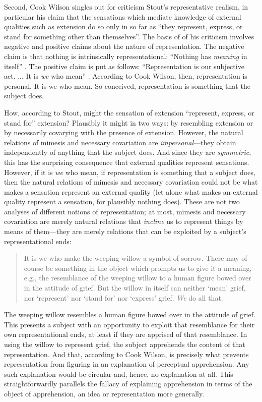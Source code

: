 \documentclass[11pt]{article}
\begin{document}
Second, Cook Wilson singles out for criticism Stout’s \citeyearpar[144]{Stout:1903zl} representative realism, in particular his claim that the sensations which mediate knowledge of external qualities such as extension do so only in so far as ``they represent, express, or stand for something other than themselves''. The basis of of his criticism involves negative and positive claims about the nature of representation. The negative claim is that nothing is intrinsically representational: ``Nothing has \emph{meaning} in itself'' \citep[770]{Cook-Wilson:1926sf}. The positive claim is put as follows: ``Representation is our subjective act. ... It is \emph{we} who mean'' \citep[770]{Cook-Wilson:1926sf}. According to Cook Wilson, then, representation is personal. It is we who mean. So conceived, representation is something that the subject does. 

How, according to Stout, might the sensation of extension ``represent, express, or stand for'' extension? Plausibly it might in two ways: by resembling extension or by necessarily covarying with the presence of extension. However, the natural relations of mimesis and necessary covariation are \emph{impersonal}---they obtain independently of anything that the subject does. And since they are \emph{symmetric}, this has the surprising consequence that external qualities represent sensations. However, if it is \emph{we} who mean, if representation is something that a subject does, then the natural relations of mimesis and necessary covariation could not be what makes a sensation represent an external quality (let alone what makes an external quality represent a sensation, for plausibly nothing does). These are not two analyses of different notions of representation; at most, mimesis and necessary covariation are merely natural relations that \emph{incline} us to represent things by means of them---they are merely relations that can be exploited by a subject's representational ends:
\begin{quote}
	It is we who make the weeping willow a symbol of sorrow. There may of course be something in the object which prompts us to give it a meaning, e.g., the resemblance of the weeping willow to a human figure bowed over in the attitude of grief. But the willow in itself can neither `mean' grief, nor `represent' nor `stand for' nor `express' grief. \emph{We} do all that.  \citep[770]{Cook-Wilson:1926sf}
\end{quote}
The weeping willow resembles a human figure bowed over in the attitude of grief. This presents a subject with an opportunity to exploit that resemblance for their own representational ends, at least if they are apprised of that resemblance. In using the willow to represent grief, the subject apprehends the content of that representation. And that, according to Cook Wilson, is precisely what prevents representation from figuring in an explanation of perceptual apprehension. Any such explanation would be circular and, hence, no explanation at all. This straightforwardly parallels the fallacy of explaining apprehension in terms of the object of apprehension, an idea or representation more generally.
\end{document}
